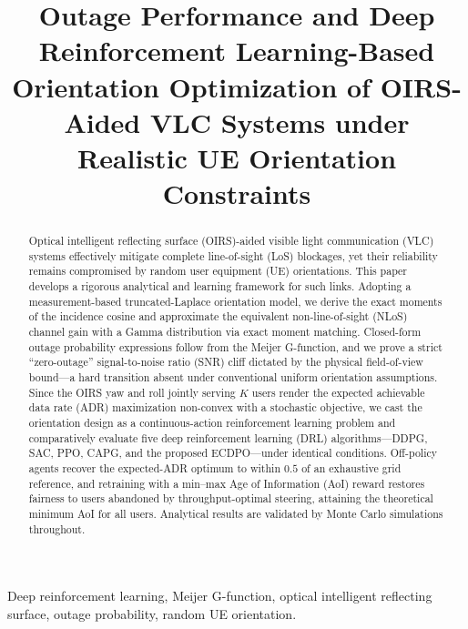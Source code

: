 \documentclass[conference]{IEEEtran}
\begin{document}
\title{Outage Performance and Deep Reinforcement Learning-Based Orientation
Optimization of OIRS-Aided VLC Systems under Realistic UE Orientation
Constraints}

\maketitle

\begin{abstract}
Optical intelligent reflecting surface (OIRS)-aided visible light
communication (VLC) systems effectively mitigate complete line-of-sight (LoS)
blockages, yet their reliability remains compromised by random user equipment
(UE) orientations. This paper develops a rigorous analytical and learning
framework for such links. Adopting a measurement-based truncated-Laplace
orientation model, we derive the exact moments of the incidence cosine and
approximate the equivalent non-line-of-sight (NLoS) channel gain with a Gamma
distribution via exact moment matching. Closed-form outage probability
expressions follow from the Meijer G-function, and we prove a strict
``zero-outage'' signal-to-noise ratio (SNR) cliff dictated by the physical
field-of-view bound---a hard transition absent under conventional uniform
orientation assumptions. Since the OIRS yaw and roll jointly serving $K$ users
render the expected achievable data rate (ADR) maximization non-convex with a
stochastic objective, we cast the orientation design as a continuous-action
reinforcement learning problem and comparatively evaluate five deep
reinforcement learning (DRL) algorithms---DDPG, SAC, PPO, CAPG, and the
proposed ECDPO---under identical conditions. Off-policy agents recover the
expected-ADR optimum to within $0.5$ of an exhaustive grid reference, and
retraining with a min--max Age of Information (AoI) reward restores fairness
to users abandoned by throughput-optimal steering, attaining the theoretical
minimum AoI for all users. Analytical results are validated by Monte Carlo
simulations throughout.
\end{abstract}

\begin{IEEEkeywords}
Deep reinforcement learning, Meijer G-function, optical intelligent
reflecting surface, outage probability, random UE orientation.
\end{IEEEkeywords}
\end{document}
